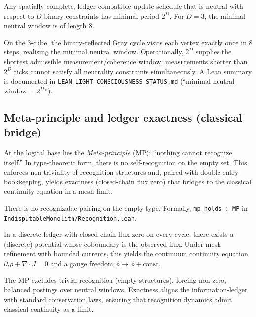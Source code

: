 \documentclass[12pt,a4paper]{article}
\begin{document}
\begin{theorem}\label{thm:minWindow}
Any spatially complete, ledger-compatible update schedule that is neutral with respect to $D$ binary constraints has minimal period $2^{D}$. For $D=3$, the minimal neutral window is of length $8$.
\end{theorem}

\begin{remark}
On the 3-cube, the binary-reflected Gray cycle visits each vertex exactly once in 8 steps, realizing the minimal neutral window. Operationally, $2^{D}$ supplies the shortest admissible measurement/coherence window: measurements shorter than $2^{D}$ ticks cannot satisfy all neutrality constraints simultaneously. A Lean summary is documented in \texttt{LEAN\_LIGHT\_CONSCIOUSNESS\_STATUS.md} (``minimal neutral window = $2^{D}$'').
\end{remark}

\subsection{Meta-principle and ledger exactness (classical bridge)}
At the logical base lies the \emph{Meta-principle} (MP): “nothing cannot recognize itself.” In type-theoretic form, there is no self-recognition on the empty set. This enforces non-triviality of recognition structures and, paired with double-entry bookkeeping, yields exactness (closed-chain flux zero) that bridges to the classical continuity equation in a mesh limit.

\begin{axiom}
There is no recognizable pairing on the empty type. Formally, \texttt{mp\_holds : MP} in \texttt{IndisputableMonolith/Recognition.lean}.
\end{axiom}

\begin{proposition}
In a discrete ledger with closed-chain flux zero on every cycle, there exists a (discrete) potential whose coboundary is the observed flux. Under mesh refinement with bounded currents, this yields the continuum continuity equation $\partial_{t}\rho+\nabla\!\cdot\!J=0$ and a gauge freedom $\phi\mapsto\phi+\text{const}$.
\end{proposition}

\begin{remark}
The MP excludes trivial recognition (empty structures), forcing non-zero, balanced postings over neutral windows. Exactness aligns the information-ledger with standard conservation laws, ensuring that recognition dynamics admit classical continuity as a limit.
\end{remark}
\end{document}
